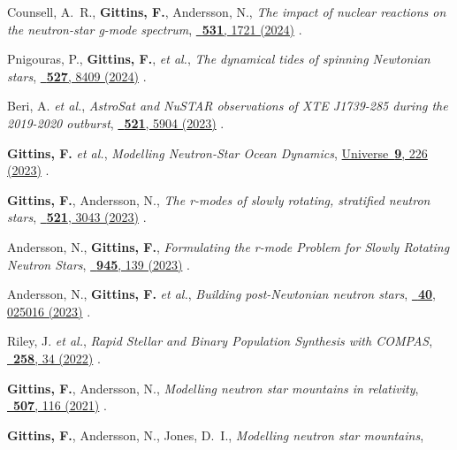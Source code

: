 \begin{etaremune}[start=\value{pubCounter}]
  Counsell, A.~R., \textbf{Gittins, F.}, Andersson, N.,
  \textit{The impact of nuclear reactions on the neutron-star g-mode spectrum},
  \href{https://doi.org/10.1093/mnras/stae1242}%
  {\mnras\ \textbf{531}, 1721 (2024)}
  .
\item
  Pnigouras, P., \textbf{Gittins, F.}, \textit{et al.},
  \textit{The dynamical tides of spinning Newtonian stars},
  \href{https://doi.org/10.1093/mnras/stad3593}%
  {\mnras\ \textbf{527}, 8409 (2024)}
  .
\item
  Beri, A. \textit{et al.},
  \textit{AstroSat and NuSTAR observations of XTE J1739-285 during the
  2019-2020 outburst},
  \href{https://doi.org/10.1093/mnras/stad902}%
  {\mnras\ \textbf{521}, 5904 (2023)}
  .
\item
  \textbf{Gittins, F.} \textit{et al.},
  \textit{Modelling Neutron-Star Ocean Dynamics},
  \href{https://doi.org/10.3390/universe9050226}%
  {Universe\ \textbf{9}, 226 (2023)}
  .
\item
  \textbf{Gittins, F.}, Andersson, N.,
  \textit{The r-modes of slowly rotating, stratified neutron stars},
  \href{https://doi.org/10.1093/mnras/stad672}%
  {\mnras\ \textbf{521}, 3043 (2023)}
  .
\item
  Andersson, N., \textbf{Gittins, F.},
  \textit{Formulating the r-mode Problem for Slowly Rotating Neutron Stars},
  \href{https://doi.org/10.3847/1538-4357/acbc1e}%
  {\apj\ \textbf{945}, 139 (2023)}
  .
\item
  Andersson, N., \textbf{Gittins, F.} \textit{et al.},
  \textit{Building post-Newtonian neutron stars},
  \href{https://doi.org/10.1088/1361-6382/acace5}%
  {\cqg\ \textbf{40}, 025016 (2023)}
  .
\item
  Riley, J. \textit{et al.},
  \textit{Rapid Stellar and Binary Population Synthesis with COMPAS},
  \href{https://doi.org/10.3847/1538-4365/ac416c}%
  {\apjs\ \textbf{258}, 34 (2022)}
  .
\item
  \textbf{Gittins, F.}, Andersson, N.,
  \textit{Modelling neutron star mountains in relativity},
  \href{https://doi.org/10.1093/mnras/stab2048}%
  {\mnras\ \textbf{507}, 116 (2021)}
  .
\item
  \textbf{Gittins, F.}, Andersson, N., Jones, D.~I.,
  \textit{Modelling neutron star mountains},

\end{etaremune}
